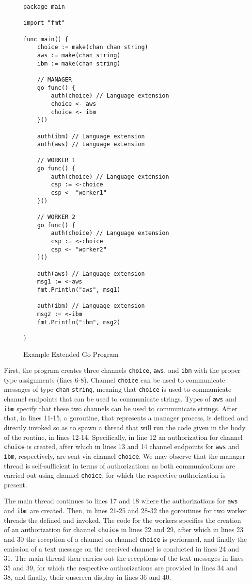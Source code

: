 \begin{figure}
\begin{lstlisting}[frame=single]
package main

import "fmt"

func main() {
	choice := make(chan chan string)
	aws := make(chan string)
	ibm := make(chan string)

	// MANAGER
	go func() {
		auth(choice) // Language extension
		choice <- aws
		choice <- ibm
	}()

	auth(ibm) // Language extension
	auth(aws) // Language extension

	// WORKER 1
	go func() {
		auth(choice) // Language extension
		csp := <-choice
		csp <- "worker1"
	}()

	// WORKER 2
	go func() {
		auth(choice) // Language extension
		csp := <-choice
		csp <- "worker2"
	}()

	auth(aws) // Language extension
	msg1 := <-aws
	fmt.Println("aws", msg1)

	auth(ibm) // Language extension
	msg2 := <-ibm
	fmt.Println("ibm", msg2)

}
\end{lstlisting}
\caption{Example Extended Go Program}
\label{fig:goprogram}
\end{figure}

First, the program creates three channels \lstinline{choice}, \lstinline{aws}, and \lstinline{ibm} with the proper type
assignments (lines 6-8).  Channel \lstinline{choice} can be used to communicate messages of type \lstinline{chan} \lstinline{string}, meaning that \lstinline{choice} is used to communicate channel endpoints
that can be used to communicate strings. Types of \lstinline{aws} and \lstinline{ibm} specify that these two channels can be used to communicate strings. %
After that, in lines 11-15, a goroutine, that represents a manager process,
is defined and directly invoked so as to spawn a thread that will run the code given in the body of the routine, in lines 12-14. Specifically, in line 12 an authorization for 
channel \lstinline{choice} is created, after which in lines 13 and 14 channel endpoints for \lstinline{aws} and \lstinline{ibm}, respectively, are sent via channel \lstinline{choice}. We may observe that the manager thread is self-sufficient in terms of authorizations as both communications are carried out using channel \lstinline{choice}, for which the respective authorization is present. 

The main thread continues to lines 17 and 18 where the authorizations for \lstinline{aws} and \lstinline{ibm} are created.
Then, in lines 21-25 and 28-32 the goroutines for two worker threads the defined and invoked. 
 The code for the workers specifies the creation of an authorization for channel \lstinline{choice} in lines 22 and 29, after which in lines 23 and 30 the reception of
a channel on channel \lstinline{choice} is performed, and finally the emission of a text message on the received channel is conducted in lines 24 and 31.
The main thread then carries out the receptions of the text messages in lines 35 and 39, for which the respective authorizations are provided in lines 34 and 38, and finally, 
their onscreen display in lines 36 and 40.

